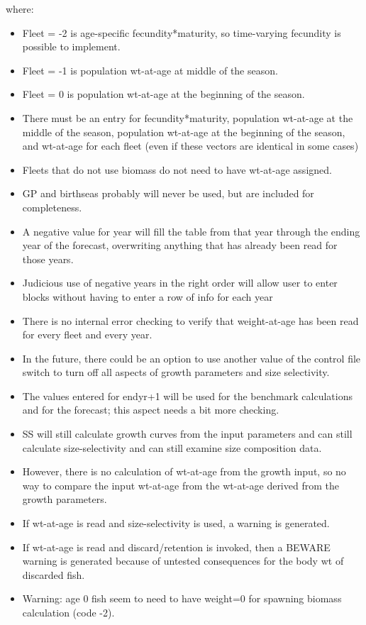 where:

\begin{itemize}
	\item Fleet = -2 is age-specific fecundity*maturity, so time-varying fecundity is possible to implement.
	\item Fleet = -1 is population wt-at-age at middle of the season.
	\item Fleet = 0 is population wt-at-age at the beginning of the season.
	\item There must be an entry for fecundity*maturity, population wt-at-age at the middle of the season, population wt-at-age at the beginning of the season, and wt-at-age for each fleet (even if these vectors are identical in some cases)
	\item Fleets that do not use biomass do not need to have wt-at-age assigned.
	\item GP and birthseas probably will never be used, but are included for completeness.
	\item A negative value for year will fill the table from that year through the ending year of the forecast, overwriting anything that has already been read for those years.
	\item Judicious use of negative years in the right order will allow user to enter blocks without having to enter a row of info for each year

	\item There is no internal error checking to  verify that weight-at-age has been read for every fleet and every year.
	\item In the future, there could be an option to use another value of the control file switch to turn off all aspects of growth parameters and size selectivity.
	\item The values entered for endyr+1 will be used for the benchmark calculations and for the forecast; this aspect needs a bit more checking.
\end{itemize}

		 \begin{itemize}
			\item SS will still calculate growth curves from the input parameters and can still calculate size-selectivity and can still examine size composition data.
			\item However, there is no calculation of wt-at-age from the growth input, so no way to compare the input wt-at-age from the wt-at-age derived from the growth parameters.
			\item If wt-at-age is read and size-selectivity is used, a warning is generated.
			\item If wt-at-age is read and discard/retention is invoked, then a BEWARE warning is generated because of untested consequences for the body wt of discarded fish.
			\item Warning:  age 0 fish seem to need to have weight=0 for spawning biomass calculation (code -2).
		\end{itemize}

